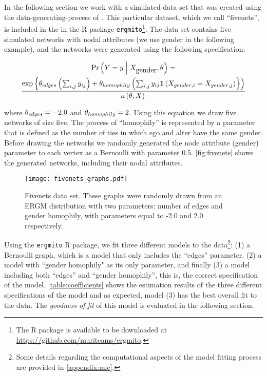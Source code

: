 \documentclass[12pt]{article}
\begin{document}
In the following section we work with a simulated data set that was created using the data-generating-process of \ergmitos{}. This particular dataset, which we call ``fivenets'', is included in the in the R package \texttt{ergmito}\footnote{The R package is available to be downloaded at  \url{https://github.com/muriteams/ergmito}.}. The data set contains five simulated networks with nodal attributes (we use gender in the following example), and the networks were generated using the following specification:

\begin{multline*}
\Prcond{\Adjmat = \adjmat}{\Indepvar_{\mbox{gender}}, \params} = \\
\frac{ %
    \exp{\params_{edges}\left(\sum_{i,j} \adjmat_{ij}\right) + %
    \params_{homophily}\left(\sum_{i,j} \adjmat_{ij}\isone{\Indepvar_{gender, i} = \Indepvar_{gender, j}}}\right) %
    }{%
    \normconst{}
    }
\end{multline*}

\noindent where $\theta_{edges} = -2.0$ and $\theta_{homophily} = 2$. Using this equation we draw five networks of size five. The process of ``homophily'' is represented by a parameter that is defined as the number of ties in which ego and alter have the same gender. Before drawing the networks we randomly generated the node attribute (gender) parameter to each vertex as a Bernoulli with parameter 0.5. \autoref{fig:fivenets} shows the generated networks, including their nodal attributes.

\begin{figure}[tb]
    \centering
    \texttt{[image: fivenets\_graphs.pdf]}
    \caption{\label{fig:fivenets}Fivenets data set. These graphs were randomly drawn from an ERGM distribution with two parameters: number of edges and gender homophily, with parameters equal to -2.0 and 2.0 respectively.}
    \label{fig:my_label}
\end{figure}

Using the \texttt{ergmito} R package, we fit three different models to the data\footnote{Some details regarding the computational aspects of the model fitting process are provided in \ref{appendix:mle}.}: (1) a Bernoulli graph, which is a model that only includes the ``edges'' parameter, (2) a model with ``gender homophily" as its only parameter, and finally (3) a model including both ``edges'' and ``gender homophily'', this is, the correct specification of the model. \autoref{table:coefficients} shows the estimation results of the three different specifications of the model and as expected, model (3) has the best overall fit to the data. The \textit{goodness of fit} of this model is evaluated in the following section.
\end{document}
